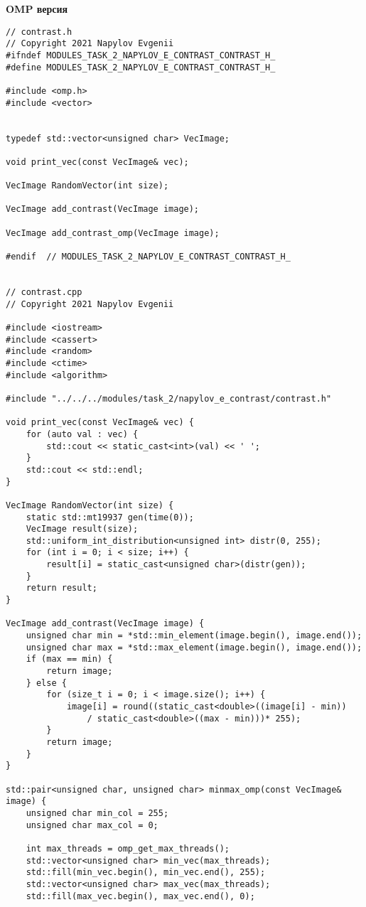 \documentclass{report}
\begin{document}
	\textbf{OMP версия}
    \begin{lstlisting}
// contrast.h
// Copyright 2021 Napylov Evgenii
#ifndef MODULES_TASK_2_NAPYLOV_E_CONTRAST_CONTRAST_H_
#define MODULES_TASK_2_NAPYLOV_E_CONTRAST_CONTRAST_H_

#include <omp.h>
#include <vector>


typedef std::vector<unsigned char> VecImage;

void print_vec(const VecImage& vec);

VecImage RandomVector(int size);

VecImage add_contrast(VecImage image);

VecImage add_contrast_omp(VecImage image);

#endif  // MODULES_TASK_2_NAPYLOV_E_CONTRAST_CONTRAST_H_


// contrast.cpp
// Copyright 2021 Napylov Evgenii

#include <iostream>
#include <cassert>
#include <random>
#include <ctime>
#include <algorithm>

#include "../../../modules/task_2/napylov_e_contrast/contrast.h"

void print_vec(const VecImage& vec) {
    for (auto val : vec) {
        std::cout << static_cast<int>(val) << ' ';
    }
    std::cout << std::endl;
}

VecImage RandomVector(int size) {
    static std::mt19937 gen(time(0));
    VecImage result(size);
    std::uniform_int_distribution<unsigned int> distr(0, 255);
    for (int i = 0; i < size; i++) {
        result[i] = static_cast<unsigned char>(distr(gen));
    }
    return result;
}

VecImage add_contrast(VecImage image) {
    unsigned char min = *std::min_element(image.begin(), image.end());
    unsigned char max = *std::max_element(image.begin(), image.end());
    if (max == min) {
        return image;
    } else {
        for (size_t i = 0; i < image.size(); i++) {
            image[i] = round((static_cast<double>((image[i] - min))
                / static_cast<double>((max - min)))* 255);
        }
        return image;
    }
}

std::pair<unsigned char, unsigned char> minmax_omp(const VecImage& image) {
    unsigned char min_col = 255;
    unsigned char max_col = 0;

    int max_threads = omp_get_max_threads();
    std::vector<unsigned char> min_vec(max_threads);
    std::fill(min_vec.begin(), min_vec.end(), 255);
    std::vector<unsigned char> max_vec(max_threads);
    std::fill(max_vec.begin(), max_vec.end(), 0);


\end{lstlisting}
\end{document}
